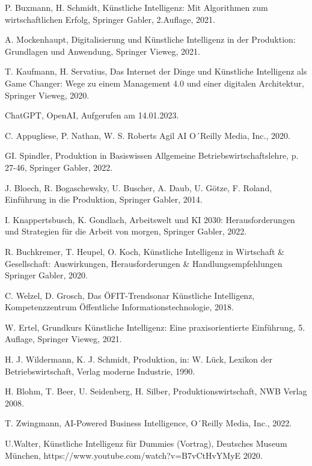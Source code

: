 

\clearpage
{}



\begin{thebibliography}{99}

	P. Buxmann, H. Schmidt,
	Künstliche Intelligenz: Mit Algorithmen zum wirtschaftlichen Erfolg,
	Springer Gabler,
	2.Auflage,
	2021.
	
	A. Mockenhaupt,
	Digitalisierung und Künstliche Intelligenz in der Produktion: Grundlagen und Anwendung,
	Springer Vieweg,
	2021.

	T. Kaufmann, H. Servatius,
	Das Internet der Dinge und Künstliche Intelligenz als Game Changer: Wege zu einem Management 4.0 und einer digitalen Architektur,
	Springer Vieweg,
	2020.

	ChatGPT,
	OpenAI,
	Aufgerufen am 14.01.2023.

	C. Appugliese, P. Nathan, W. S. Roberts
	Agil AI
	O´Reilly Media, Inc.,
	2020.

	GI. Spindler,
	Produktion in Basiswissen Allgemeine Betriebswirtschaftslehre,
	p. 27-46,
	Springer Gabler,
	2022.

	J. Bloech, R. Bogaschewsky, U. Buscher, A. Daub, U. Götze, F. Roland,
	Einführung in die Produktion,
	Springer Gabler, 
	2014.
	
	I. Knappertsbusch, K. Gondlach,
	Arbeitswelt und KI 2030: Herausforderungen und Strategien für die Arbeit von morgen,
	Springer Gabler,
	2022.

	R. Buchkremer, T. Heupel, O. Koch,
	Künstliche Intelligenz in Wirtschaft \& Gesellschaft: Auswirkungen, Herausforderungen \& Handlungsempfehlungen
	Springer Gabler,
	2020.

	C. Welzel, D. Grosch,
	Das ÖFIT-Trendsonar Künstliche Intelligenz,
	Kompetenzzentrum Öffentliche Informationstechnologie,
	2018.

	W. Ertel,
	Grundkurs Künstliche Intelligenz: Eine praxisorientierte Einführung,
	5. Auflage,
	Springer Vieweg,
	2021.

	H. J. Wildermann, K. J. Schmidt,
	Produktion, 
	in: W. Lück, Lexikon der Betriebswirtschaft,
	Verlag moderne Industrie,
	1990.

	H. Blohm, T. Beer, U. Seidenberg, H. Silber,
	Produktionswirtschaft,
	NWB Verlag
	2008.

	T. Zwingmann,
	AI-Powered Business Intelligence,
	O´Reilly Media, Inc.,
	2022.

	U.Walter,
	Künstliche Intelligenz für Dummies (Vortrag),
	Deutsches Museum München,
	https://www.youtube.com/watch?v=B7vCtHvYMyE
	2020.



\end{thebibliography}